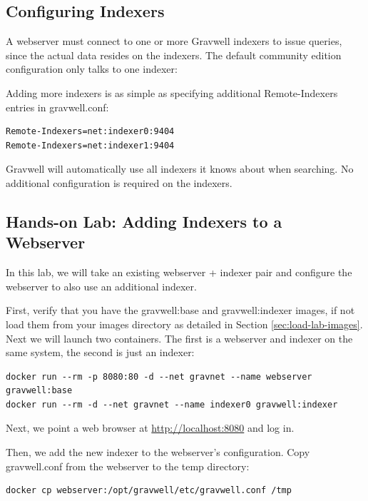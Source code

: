 \subsection{Configuring Indexers}

A webserver must connect to one or more Gravwell indexers to issue
queries, since the actual data resides on the indexers. The default
community edition configuration only talks to one indexer:


Adding more indexers is as simple as specifying additional
Remote-Indexers entries in gravwell.conf:

\begin{Verbatim}[breaklines=true]
Remote-Indexers=net:indexer0:9404
Remote-Indexers=net:indexer1:9404
\end{Verbatim}

Gravwell will automatically use all indexers it knows about when
searching. No additional configuration is required on the indexers.

\subsection{Hands-on Lab: Adding Indexers to a Webserver}

In this lab, we will take an existing webserver + indexer pair and
configure the webserver to also use an additional indexer.

First, verify that you have the gravwell:base and gravwell:indexer
images, if not load them from your images directory as detailed in
Section \ref{sec:load-lab-images}. Next we will
launch two containers. The first is a webserver and indexer on the same
system, the second is just an indexer:

\begin{Verbatim}[breaklines=true]
docker run --rm -p 8080:80 -d --net gravnet --name webserver gravwell:base
docker run --rm -d --net gravnet --name indexer0 gravwell:indexer
\end{Verbatim}

Next, we point a web browser at
\href{http://localhost:8080}{http://localhost:8080} and log in.

Then, we add the new indexer to the webserver's configuration. Copy gravwell.conf from
the webserver to the temp directory:

\begin{Verbatim}[breaklines=true]
docker cp webserver:/opt/gravwell/etc/gravwell.conf /tmp
\end{Verbatim}

